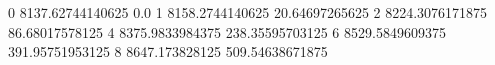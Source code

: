 0 8137.62744140625 0.0
1 8158.2744140625 20.64697265625
2 8224.3076171875 86.68017578125
4 8375.9833984375 238.35595703125
6 8529.5849609375 391.95751953125
8 8647.173828125 509.54638671875
